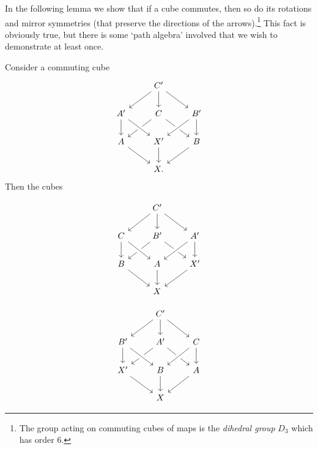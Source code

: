 In the following lemma we show that if a cube commutes, then so do its rotations and mirror symmetries (that preserve the directions of the arrows).\footnote{The group acting on commuting cubes of maps is the \emph{dihedral group} $D_3$ which has order $6$.} This fact is obviously true, but there is some `path algebra' involved that we wish to demonstrate at least once.

\begin{lem}
  Consider a commuting cube
  \begin{equation*}
    \begin{tikzcd}
      & C' \arrow[dl] \arrow[d] \arrow[dr] \\
      A' \arrow[d] & C \arrow[dl] \arrow[dr] & B' \arrow[dl,crossing over] \arrow[d] \\
      A \arrow[dr] & X' \arrow[from=ul,crossing over] \arrow[d] & B \arrow[dl] \\
      & X.
    \end{tikzcd}
  \end{equation*}
  Then the cubes

  \begin{center}
  \begin{minipage}{.3\textwidth}
  \begin{equation*}
    \begin{tikzcd}
      & C' \arrow[dl] \arrow[d] \arrow[dr] \\
      C \arrow[d] & B' \arrow[dl] \arrow[dr] & A' \arrow[dl,crossing over] \arrow[d] \\
      B \arrow[dr] & A \arrow[from=ul,crossing over] \arrow[d] & X' \arrow[dl] \\
      & X
    \end{tikzcd}
  \end{equation*}
  \end{minipage}
  \begin{minipage}{.3\textwidth}
  \begin{equation*}
    \begin{tikzcd}
      & C' \arrow[dl] \arrow[d] \arrow[dr] \\
      B' \arrow[d] & A' \arrow[dl] \arrow[dr] & C \arrow[dl,crossing over] \arrow[d] \\
      X' \arrow[dr] & B \arrow[from=ul,crossing over] \arrow[d] & A \arrow[dl] \\
      & X
    \end{tikzcd}
  \end{equation*}
  \end{minipage}


\end{center}
\end{lem}
